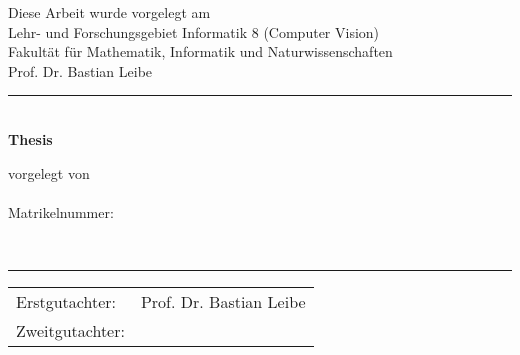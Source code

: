 \begin{titlepage}
	\thispagestyle{fancytitle}
	\begin{center}

		{
			\sffamily
			Diese Arbeit wurde vorgelegt am\\
			Lehr- und Forschungsgebiet Informatik 8 (Computer Vision)\\
			Fakultät für Mathematik, Informatik und Naturwissenschaften\\
			Prof. Dr. Bastian Leibe
		}

		\vspace{1em}

		\rule{\linewidth}{0.5mm}
		~\\[2em]

		{
			\huge \bfseries
			 Thesis
		}

		\vfill

		{
			\sffamily \huge \bfseries \thetitle
		}

		\vfill

		{
			\Large
			vorgelegt von\\[1em]
			\textsf{\textbf{\theauthor}}\\
			Matrikelnummer: \matrnumber
			\\[0.5em]
			\thedate
		}

		~\\[2em]
		\rule{\linewidth}{0.5mm}

		\vspace{2em}


		\begin{tabular}{ll}
			Erstgutachter:  & Prof. Dr. Bastian Leibe\\
			Zweitgutachter: & \zweitgutachter\\
		\end{tabular}
	
	\end{center}
	\restoregeometry
\end{titlepage}

